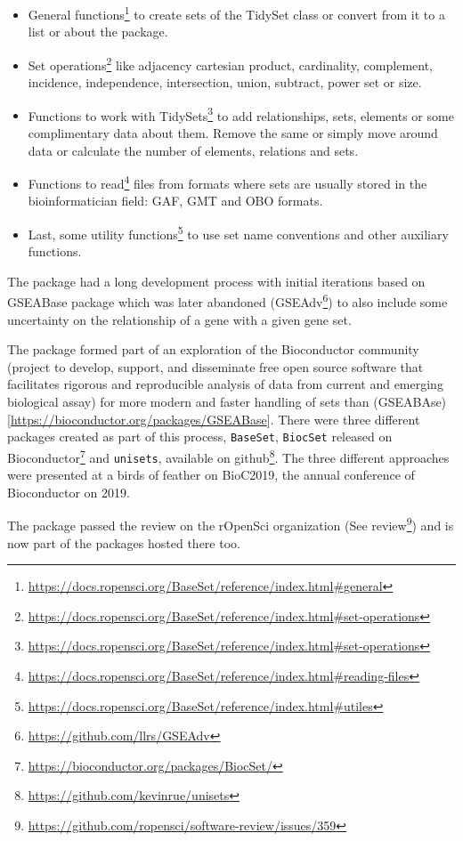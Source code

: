 \documentclass[
  a4paper,
]{book}
\DeclareRobustCommand{\href}[2]{#2\footnote{\url{#1}}}
\begin{document}
\begin{itemize}
\item
  \href{https://docs.ropensci.org/BaseSet/reference/index.html\#general}{General functions} to create sets of the TidySet class or convert from it to a list or about the package.
\item
  \href{https://docs.ropensci.org/BaseSet/reference/index.html\#set-operations}{Set operations} like adjacency cartesian product, cardinality, complement, incidence, independence, intersection, union, subtract, power set or size.
\item
  \href{https://docs.ropensci.org/BaseSet/reference/index.html\#set-operations}{Functions to work with TidySets} to add relationships, sets, elements or some complimentary data about them.
  Remove the same or simply move around data or calculate the number of elements, relations and sets.
\item
  \href{https://docs.ropensci.org/BaseSet/reference/index.html\#reading-files}{Functions to read} files from formats where sets are usually stored in the bioinformatician field: GAF, GMT and OBO formats.
\item
  Last, some \href{https://docs.ropensci.org/BaseSet/reference/index.html\#utiles}{utility functions} to use set name conventions and other auxiliary functions.
\end{itemize}

The package had a long development process with initial iterations based on GSEABase package which was later abandoned (\href{https://github.com/llrs/GSEAdv}{GSEAdv}) to also include some uncertainty on the relationship of a gene with a given gene set.

The package formed part of an exploration of the Bioconductor community (project to develop, support, and disseminate free open source software that facilitates rigorous and reproducible analysis of data from current and emerging biological assay) for more modern and faster handling of sets than (GSEABAse){[}\url{https://bioconductor.org/packages/GSEABase}{]}.
There were three different packages created as part of this process, \texttt{BaseSet}, \texttt{BiocSet} released \href{https://bioconductor.org/packages/BiocSet/}{on Bioconductor} and \texttt{unisets}, available \href{https://github.com/kevinrue/unisets}{on github}.
The three different approaches were presented at a birds of feather on BioC2019, the annual conference of Bioconductor on 2019.

The package passed the review on the rOpenSci organization (\href{https://github.com/ropensci/software-review/issues/359}{See review}) and is now part of the packages hosted there too.
\end{document}
